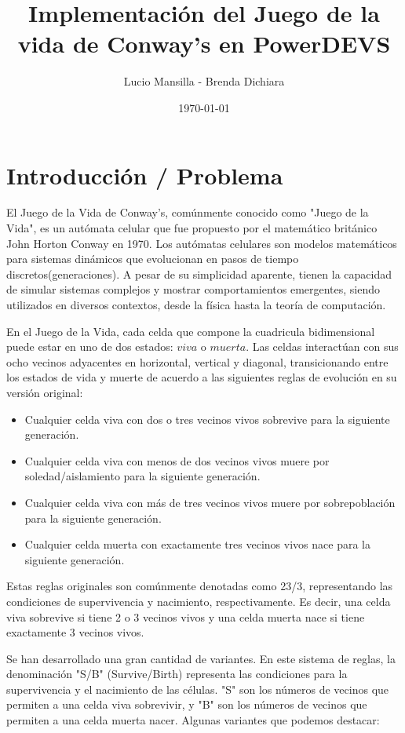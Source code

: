 \documentclass[]{article}
\title{\textbf{Implementación del Juego de la vida de Conway's en PowerDEVS}}
\author{Lucio Mansilla - Brenda Dichiara}
\date{\today}
\begin{document}
\maketitle

\section{Introducción / Problema}
El Juego de la Vida de Conway's, comúnmente conocido como "Juego de la Vida", es un autómata celular que fue propuesto por el matemático británico John Horton Conway en 1970. Los autómatas celulares son modelos matemáticos para sistemas dinámicos que evolucionan en pasos de tiempo discretos(generaciones). A pesar de su simplicidad aparente, tienen la capacidad de simular sistemas complejos y mostrar comportamientos emergentes, siendo utilizados en diversos contextos, desde la física hasta la teoría de computación.

En el Juego de la Vida, cada celda que compone la cuadricula bidimensional puede estar en uno de dos estados: $viva$ o $muerta$. Las celdas interactúan con sus ocho vecinos adyacentes en horizontal, vertical y diagonal, transicionando entre los estados de vida y muerte de acuerdo a las siguientes reglas de evolución en su versión original:

\begin{itemize}
  \item Cualquier celda viva con dos o tres vecinos vivos sobrevive para la siguiente generación.
  \item Cualquier celda viva con menos de dos vecinos vivos muere por soledad/aislamiento para la siguiente generación.
  \item Cualquier celda viva con más de tres vecinos vivos muere por sobrepoblación para la siguiente generación.
  \item Cualquier celda muerta con exactamente tres vecinos vivos nace para la siguiente generación.
\end{itemize}

Estas reglas originales son comúnmente denotadas como 23/3, representando las condiciones de supervivencia y nacimiento, respectivamente. Es decir, una celda viva sobrevive si tiene 2 o 3 vecinos vivos y una celda muerta nace si tiene exactamente 3 vecinos vivos.

Se han desarrollado una gran cantidad de variantes. En este sistema de reglas, la denominación "S/B" (Survive/Birth) representa las condiciones para la supervivencia y el nacimiento de las células. "S" son los números de vecinos que permiten a una celda viva sobrevivir, y "B" son los números de vecinos que permiten a una celda muerta nacer. Algunas variantes que podemos destacar:
\end{document}
